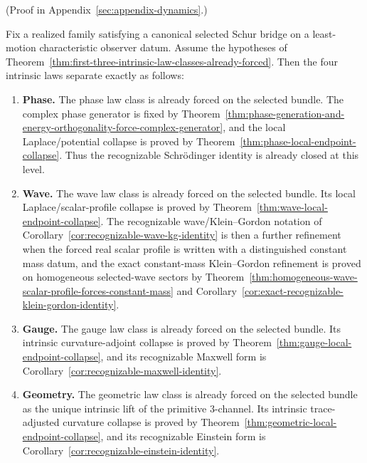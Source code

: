 (Proof in Appendix~\ref{sec:appendix-dynamics}.)

\begin{theorem}
\label{thm:lane-by-lane-intrinsic-closure-frontier}
Fix a realized family satisfying a canonical selected Schur bridge on a
least-motion characteristic observer datum. Assume the hypotheses of
Theorem~\ref{thm:first-three-intrinsic-law-classes-already-forced}. Then the
four intrinsic laws separate exactly as follows:
\begin{enumerate}[label=(\roman*), leftmargin=2em, itemsep=0.2em]
\item \textbf{Phase.} The phase law class is already forced on the selected
      bundle. The complex phase generator is fixed by
      Theorem~\ref{thm:phase-generation-and-energy-orthogonality-force-complex-generator},
      and the local Laplace/potential collapse is proved by
      Theorem~\ref{thm:phase-local-endpoint-collapse}. Thus the recognizable
      Schr\"odinger identity is already closed at this level.
\item \textbf{Wave.} The wave law class is already forced on the selected
      bundle. Its local Laplace/scalar-profile collapse is proved by
      Theorem~\ref{thm:wave-local-endpoint-collapse}. The recognizable
      wave/Klein--Gordon notation of
      Corollary~\ref{cor:recognizable-wave-kg-identity} is then a further
      refinement when the forced real scalar profile is written with a
      distinguished constant mass datum, and the exact constant-mass
      Klein--Gordon refinement is proved on homogeneous selected-wave sectors
      by
      Theorem~\ref{thm:homogeneous-wave-scalar-profile-forces-constant-mass}
      and Corollary~\ref{cor:exact-recognizable-klein-gordon-identity}.
\item \textbf{Gauge.} The gauge law class is already forced on the selected
      bundle. Its intrinsic curvature-adjoint collapse is proved by
      Theorem~\ref{thm:gauge-local-endpoint-collapse}, and its recognizable
      Maxwell form is Corollary~\ref{cor:recognizable-maxwell-identity}.
\item \textbf{Geometry.} The geometric law class is already forced on the
      selected bundle as the unique intrinsic lift of the primitive
      \(3\)-channel. Its intrinsic trace-adjusted curvature collapse is proved
      by Theorem~\ref{thm:geometric-local-endpoint-collapse}, and its
      recognizable Einstein form is
      Corollary~\ref{cor:recognizable-einstein-identity}.
\end{enumerate}
\end{theorem}

